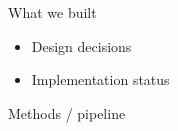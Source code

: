 
\begin{frame}{What we built}
  \begin{itemize}
    \item Design decisions
    \item Implementation status
  \end{itemize}
\end{frame}

\begin{frame}{Methods / pipeline}
\end{frame}
